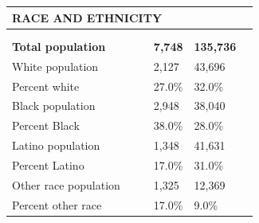 \documentclass[9pt]{report}
\begin{document}
\vspace{12pt}
\setlength{\tabcolsep}{.01in} %
\begin{tabular}{p{.10in}p{.10in}p{.10in}p{3.7in}>{\hfill}p{.85in}>{\hfill}p{.85in}>{\hfill}p{.85in}>{\hfill}p{.85in}p{0.1in}}
\multicolumn{9}{l}{\parbox{7.1in}{\raggedright{\large{\strut\textbf{RACE AND ETHNICITY}\strut}}}} \\ 
\hline
\multicolumn{4}{l}{\parbox{3.5in}{\raggedright{\textbf{}}}} & \multicolumn{1}{r}{\parbox{.85in}{\strut\raggedleft{\textbf{}\strut}}} & \multicolumn{1}{r}{\parbox{.85in}{\strut\raggedleft{\textbf{}\strut}}} & \multicolumn{1}{r}{\parbox{.85in}{\strut{}}} & \multicolumn{1}{r}{\parbox{.85in}{\strut{}}} & \\ 
\multicolumn{9}{l}{} \\ 
\multicolumn{4}{l}{\parbox{3.5in}{\strut\raggedright{\textbf{Total population}\strut}}} & \textbf{} & \textbf{} & \textbf{7,748} & \textbf{135,736} & \textbf{} \\ 
\multicolumn{4}{l}{\parbox{3.6in}{\strut\raggedright{{White population}}\strut}} &  &  & 2,127 & 43,696 & \multicolumn{1}{l}{}  \\ 
\multicolumn{4}{l}{\parbox{3.6in}{\strut\raggedright{{Percent white}}\strut}} &  &  & 27.0\% & 32.0\% & \multicolumn{1}{l}{}  \\ 
\multicolumn{4}{l}{\parbox{3.6in}{\strut\raggedright{{Black population}}\strut}} &  &  & 2,948 & 38,040 & \multicolumn{1}{l}{}  \\ 
\multicolumn{4}{l}{\parbox{3.6in}{\strut\raggedright{{Percent Black}}\strut}} &  &  & 38.0\% & 28.0\% & \multicolumn{1}{l}{}  \\ 
\multicolumn{4}{l}{\parbox{3.6in}{\strut\raggedright{{Latino population}}\strut}} &  &  & 1,348 & 41,631 & \multicolumn{1}{l}{}  \\ 
\multicolumn{4}{l}{\parbox{3.6in}{\strut\raggedright{{Percent Latino}}\strut}} &  &  & 17.0\% & 31.0\% & \multicolumn{1}{l}{}  \\ 
\multicolumn{4}{l}{\parbox{3.6in}{\strut\raggedright{{Other race population}}\strut}} &  &  & 1,325 & 12,369 & \multicolumn{1}{l}{}  \\ 
\multicolumn{4}{l}{\parbox{3.6in}{\strut\raggedright{{Percent other race}}\strut}} &  &  & 17.0\% & 9.0\% & \multicolumn{1}{l}{}  \\ 

\end{tabular}
\setlength{\tabcolsep}{6pt} %
\end{document}

